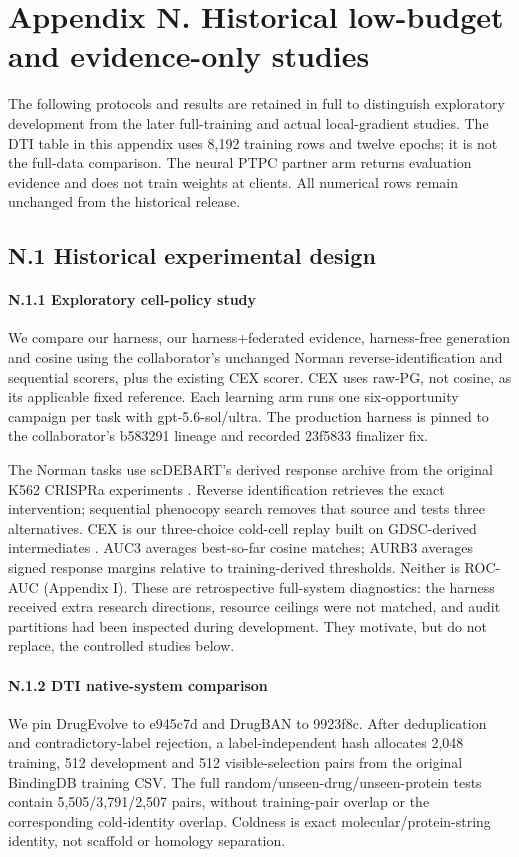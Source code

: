 \section*{Appendix N. Historical low-budget and evidence-only studies}
The following protocols and results are retained in full to distinguish exploratory development from the later full-training and actual local-gradient studies. The DTI table in this appendix uses 8,192 training rows and twelve epochs; it is not the full-data comparison. The neural PTPC partner arm returns evaluation evidence and does not train weights at clients. All numerical rows remain unchanged from the historical release.

\subsection*{N.1 Historical experimental design}
\paragraph{N.1.1 Exploratory cell-policy study}
We compare our harness, our harness+federated evidence, harness-free generation and cosine using the collaborator's unchanged Norman reverse-identification and sequential scorers, plus the existing CEX scorer. CEX uses raw-PG, not cosine, as its applicable fixed reference. Each learning arm runs one six-opportunity campaign per task with gpt-5.6-sol/ultra. The production harness is pinned to the collaborator's b583291 lineage and recorded 23f5833 finalizer fix.

The Norman tasks use scDEBART's derived response archive from the original K562 CRISPRa experiments \citep{norman2019genetic,sung2026scdebart}. Reverse identification retrieves the exact intervention; sequential phenocopy search removes that source and tests three alternatives. CEX is our three-choice cold-cell replay built on GDSC-derived intermediates \citep{yang2013gdsc}. AUC3 averages best-so-far cosine matches; AURB3 averages signed response margins relative to training-derived thresholds. Neither is ROC-AUC (Appendix I). These are retrospective full-system diagnostics: the harness received extra research directions, resource ceilings were not matched, and audit partitions had been inspected during development. They motivate, but do not replace, the controlled studies below.

\paragraph{N.1.2 DTI native-system comparison}
We pin DrugEvolve to e945c7d and DrugBAN to 9923f8c. After deduplication and contradictory-label rejection, a label-independent hash allocates 2,048 training, 512 development and 512 visible-selection pairs from the original BindingDB training CSV. The full random/unseen-drug/unseen-protein tests contain 5,505/3,791/2,507 pairs, without training-pair overlap or the corresponding cold-identity overlap. Coldness is exact molecular/protein-string identity, not scaffold or homology separation.

